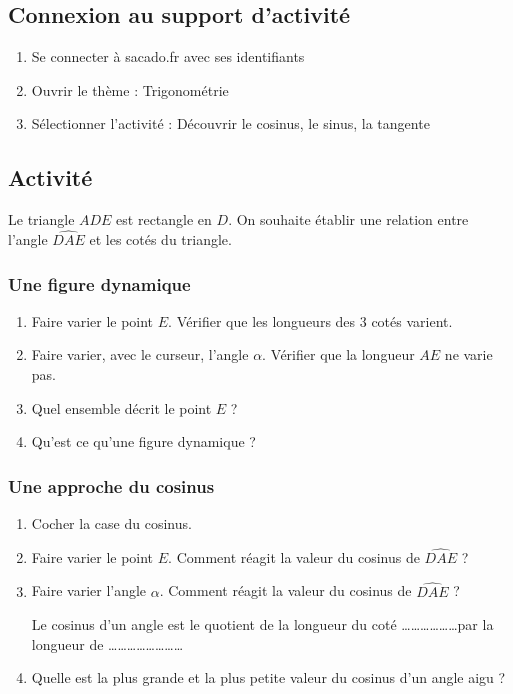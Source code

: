 
\subsection{Connexion au support d'activité}


\begin{enumerate}
\item Se connecter à sacado.fr avec ses identifiants
\item Ouvrir le thème : Trigonométrie
\item Sélectionner l'activité : Découvrir le cosinus, le sinus, la tangente
\end{enumerate}


\subsection{Activité}

Le triangle $ADE$ est rectangle en $D$. On souhaite établir une relation entre l'angle $\widehat{DAE}$ et les cotés du triangle. 


\subsubsection{ Une figure dynamique}

\begin{enumerate}
\item Faire varier le point $E$. Vérifier que les longueurs des 3 cotés varient.
\item Faire varier, avec le curseur, l'angle $\alpha$. Vérifier que la longueur $AE$ ne varie pas.
\item Quel ensemble décrit le point $E$ ? 
\item Qu'est ce qu'une figure dynamique ? 
\end{enumerate}

\subsubsection{Une approche du cosinus}


\begin{enumerate}
\item Cocher la case du cosinus.
\item Faire varier le point $E$. Comment réagit la valeur du cosinus de $\widehat{DAE}$ ? 
\item Faire varier l'angle $\alpha$. Comment réagit la valeur du cosinus de $\widehat{DAE}$ ? 

\begin{Conjecture}
Le cosinus d'un angle est le quotient de la longueur du coté \ldots\ldots\ldots\ldots\ldots\ldots par la longueur de  \ldots\ldots\ldots\ldots\ldots\ldots\ldots\ldots
\end{Conjecture}


\item Quelle est la plus grande et la plus petite valeur du cosinus d'un angle aigu ? 
\end{enumerate}

